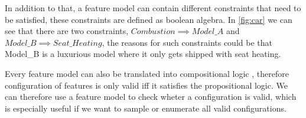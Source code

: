 In addition to that, a feature model can contain different constraints that need to be satisfied, these constraints are defined as boolean 
algebra. In \ref{fig:car} we can see that there are two constraints, $Combustion \implies Model\_A$ and 
$Model\_B \implies Seat\_Heating$, the reasons for such constraints could be that Model\_B is a luxurious model where it only gets shipped
with seat heating.

Every feature model can also be translated into compositional logic \cite*{Feature-Oriented-Software-Product-Lines-Feature-models}, therefore
configuration of features is only valid iff it satisfies the propositional logic. We can therefore use a feature model to check wheter a 
configuration is valid, which is especially useful if we want to sample or enumerate all valid configurations.